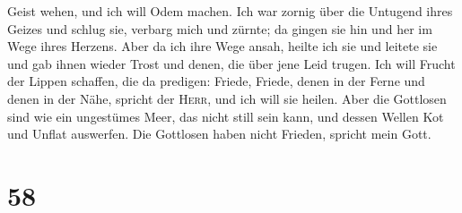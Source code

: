 Geist wehen, und ich will Odem machen.  Ich war zornig
über die Untugend ihres Geizes und schlug sie, verbarg mich und zürnte;
da gingen sie hin und her im Wege ihres Herzens.  Aber da
ich ihre Wege ansah, heilte ich sie und leitete sie und gab ihnen wieder
Trost und denen, die über jene Leid trugen.  Ich will
Frucht der Lippen schaffen, die da predigen: Friede, Friede, denen in
der Ferne und denen in der Nähe, spricht der \textsc{Herr}, und ich will
sie heilen.  Aber die Gottlosen sind wie ein ungestümes
Meer, das nicht still sein kann, und dessen Wellen Kot und Unflat
auswerfen.  Die Gottlosen haben nicht Frieden, spricht
mein Gott.

\hypertarget{section-57}{%
\section{58}\label{section-57}}

